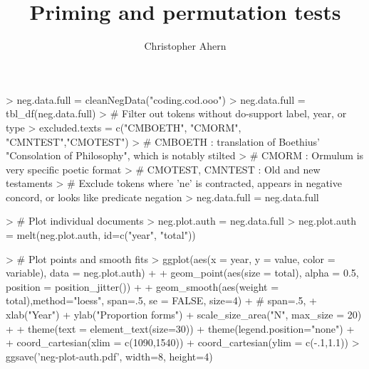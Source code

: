 \documentclass{article}
\begin{document}


\author{Christopher Ahern}
\title{Priming and permutation tests}

\maketitle

\section{}


\begin{Schunk}
\begin{Sinput}
> neg.data.full = cleanNegData("coding.cod.ooo")
> neg.data.full = tbl_df(neg.data.full)
> # Filter out tokens without do-support label, year, or type
> excluded.texts = c("CMBOETH", "CMORM", "CMNTEST","CMOTEST")
> # CMBOETH : translation of Boethius' "Consolation of Philosophy", which is notably stilted
> # CMORM   : Ormulum is very specific poetic format
> # CMOTEST, CMNTEST : Old and new testaments
> # Exclude tokens where 'ne' is contracted, appears in negative concord, or looks like predicate negation
> neg.data.full = neg.data.full %
\end{Sinput}
\end{Schunk}

\begin{Schunk}
\begin{Sinput}
> # Plot individual documents
> neg.plot.auth = neg.data.full %
> neg.plot.auth = melt(neg.plot.auth, id=c("year", "total"))
\end{Sinput}
\end{Schunk}

\begin{Schunk}
\begin{Sinput}
> # Plot points and smooth fits
> ggplot(aes(x = year, y = value, color = variable), data = neg.plot.auth) +
+   geom_point(aes(size = total), alpha = 0.5, position = position_jitter()) +
+   geom_smooth(aes(weight = total),method="loess", span=.5, se = FALSE, size=4) + # span=.5,
+   xlab("Year") +   ylab("Proportion forms") +   scale_size_area("N", max_size = 20) +
+   theme(text = element_text(size=30)) +   theme(legend.position="none") +
+   coord_cartesian(xlim = c(1090,1540)) +  coord_cartesian(ylim = c(-.1,1.1))
> ggsave('neg-plot-auth.pdf', width=8, height=4)
\end{Sinput}
\end{Schunk}
\end{document}
